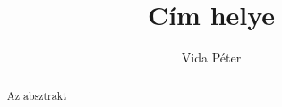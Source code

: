 \documentclass[a4paper, twocolumn]{article}
\title{C\'im helye}
\author{Vida P\'eter}
\begin{document}
\maketitle

\begin{abstract}
	Az absztrakt
\end{abstract}


\end{document}
